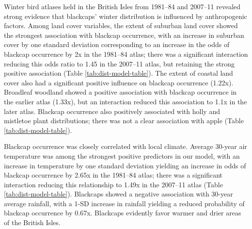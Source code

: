 \documentclass[a4paper, twoside]{templates/ociamthesis}
\begin{document}
Winter bird atlases held in the British Isles from 1981--84 and 2007--11 revealed strong evidence that blackcaps' winter distribution is influenced by anthropogenic factors. Among land cover variables, the extent of suburban land cover showed the strongest association with blackcap occurrence, with an increase in suburban cover by one standard deviation corresponding to an increase in the odds of blackcap occurrence by 2x in the 1981--84 atlas; there was a significant interaction reducing this odds ratio to 1.45 in the 2007--11 atlas, but retaining the strong positive association (Table \ref{tab:dist-model-table}). The extent of coastal land cover also had a significant positive influence on blackcap occurrence (1.22x). Broadleaf woodland showed a positive association with blackcap occurrence in the earlier atlas (1.33x), but an interaction reduced this association to 1.1x in the later atlas. Blackcap occurrence also positively associated with holly and mistletoe plant distributions; there was not a clear association with apple (Table \ref{tab:dist-model-table}).

Blackcap occurrence was closely correlated with local climate. Average 30-year air temperature was among the strongest positive predictors in our model, with an increase in temperature by one standard deviation yielding an increase in odds of blackcap occurrence by 2.65x in the 1981--84 atlas; there was a significant interaction reducing this relationship to 1.49x in the 2007--11 atlas (Table \ref{tab:dist-model-table}). Blackcaps showed a negative association with 30-year average rainfall, with a 1-SD increase in rainfall yielding a reduced probability of blackcap occurrence by 0.67x. Blackcaps evidently favor warmer and drier areas of the British Isles.
\end{document}
